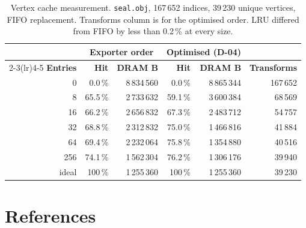 \documentclass[11pt,a4paper]{article}
\begin{document}
\begin{table}[ht]
\centering
\small
\begin{tabular}{@{}rrrrrr@{}}
\toprule
& \multicolumn{2}{c}{\textbf{Exporter order}} &
  \multicolumn{2}{c}{\textbf{Optimised (D-04)}} & \\
\cmidrule(lr){2-3}\cmidrule(lr){4-5}
\textbf{Entries} & \textbf{Hit} & \textbf{DRAM B} &
\textbf{Hit} & \textbf{DRAM B} & \textbf{Transforms} \\
\midrule
0     & 0.0\,\%   & 8\,834\,560 & 0.0\,\%   & 8\,865\,344 & 167\,652 \\
8     & 65.5\,\%  & 2\,733\,632 & 59.1\,\%  & 3\,600\,384 & 68\,569 \\
16    & 66.2\,\%  & 2\,656\,832 & 67.3\,\%  & 2\,483\,712 & 54\,757 \\
32    & 68.8\,\%  & 2\,312\,832 & 75.0\,\%  & 1\,466\,816 & 41\,884 \\
64    & 69.4\,\%  & 2\,232\,064 & 75.8\,\%  & 1\,354\,880 & 40\,516 \\
256   & 74.1\,\%  & 1\,562\,304 & 76.2\,\%  & 1\,306\,176 & 39\,940 \\
\midrule
ideal & 100\,\%   & 1\,255\,360 & 100\,\%   & 1\,255\,360 & 39\,230 \\
\bottomrule
\end{tabular}
\caption{Vertex cache measurement. \texttt{seal.obj}, 167\,652 indices, 39\,230
unique vertices, FIFO replacement. Transforms column is for the optimised
order. LRU differed from FIFO by less than 0.2\,\% at every size.}
\label{tab:vcache}
\end{table}

\section*{References}

\end{document}
